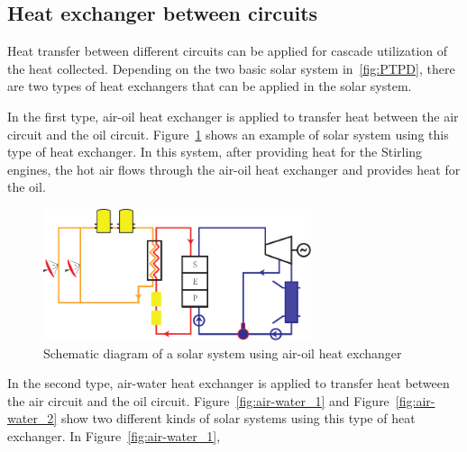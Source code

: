 \subsection{Heat exchanger between circuits}
\label{sec:hebc}

Heat transfer between different circuits can be applied for cascade utilization of the heat collected. Depending on the two basic solar system in~\ref{fig:PTPD}, there are two types of heat exchangers that can be applied in the solar system.

In the first type, air-oil heat exchanger is applied to transfer heat between the air circuit and the oil circuit. Figure~\ref{fig:air-oil} shows an example of solar system using this type of heat exchanger. In this system, after providing heat for the Stirling engines, the hot air flows through the air-oil heat exchanger and provides heat for the oil. 

\begin{figure}[h]
\centering 
\includegraphics[width=0.7\textwidth]{fig/air-oil}
\caption{Schematic diagram of a solar system using air-oil heat exchanger}\label{fig:air-oil}
\end{figure}

In the second type, air-water heat exchanger is applied to transfer heat between the air circuit and the oil circuit. Figure~\ref{fig:air-water_1} and Figure~\ref{fig:air-water_2} show two different kinds of solar systems using this type of heat exchanger. In Figure~\ref{fig:air-water_1}, 

